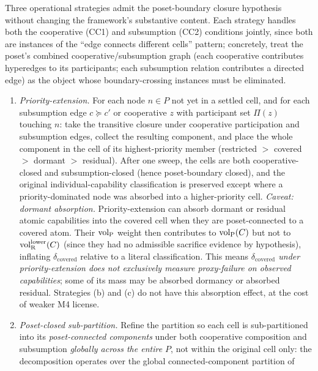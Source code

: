 \begin{remark}
\label{rem:cell_cooperative_closure}
Three operational strategies admit the poset-boundary closure
hypothesis without changing the framework's substantive content.
Each strategy handles both the cooperative (CC1) and subsumption
(CC2) conditions jointly, since both are instances of the
``edge connects different cells'' pattern; concretely, treat the
poset's combined cooperative/subsumption graph (each cooperative
contributes hyperedges to its participants; each subsumption
relation contributes a directed edge) as the object whose
boundary-crossing instances must be eliminated.
\begin{enumerate}
\item[(a)] \emph{Priority-extension.}  For each node
  $n \in P$ not yet in a settled cell, and for each subsumption
  edge $c \succeq c'$ or cooperative $z$ with participant set
  $\Pi(z)$ touching $n$: take the transitive closure under
  cooperative participation and subsumption edges, collect the
  resulting component, and place the whole component in the
  cell of its highest-priority member
  (restricted $>$ covered $>$ dormant $>$ residual).  After one
  sweep, the cells are both cooperative-closed and
  subsumption-closed (hence poset-boundary closed), and the
  original individual-capability classification is preserved
  except where a priority-dominated node was absorbed into a
  higher-priority cell.  \emph{Caveat: dormant absorption.}
  Priority-extension can absorb dormant or residual atomic
  capabilities into the covered cell when they are
  poset-connected to a covered atom.  Their ${\operatorname{vol}_{\mathrm{P}}}$ weight
  then contributes to ${\operatorname{vol}_{\mathrm{P}}}(C)$ but not to ${\operatorname{vol}_{\mathrm{R}}^{\mathrm{lower}}}(C)$
  (since they had no admissible sacrifice evidence by hypothesis),
  inflating $\delta_{\mathrm{covered}}$ relative to a literal
  classification.  This means \emph{$\delta_{\mathrm{covered}}$
  under priority-extension does not exclusively measure
  proxy-failure on observed capabilities}; some of its mass
  may be absorbed dormancy or absorbed residual.  Strategies
  (b) and (c) do not have this absorption effect, at the cost
  of weaker M4 license.
\item[(b)] \emph{Poset-closed sub-partition.}  Refine the
  partition so each cell is sub-partitioned into its
  \emph{poset-connected components} under both cooperative
  composition and subsumption \emph{globally across the entire
  $P$}, not within the original cell only: the decomposition
  operates over the global connected-component partition of

\end{enumerate}
\end{remark}
